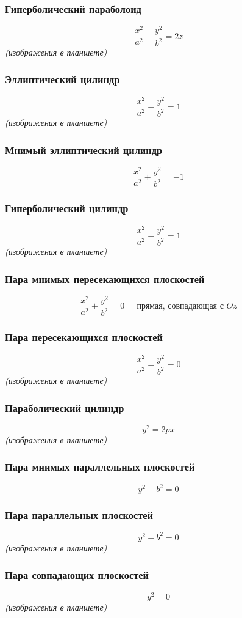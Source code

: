 \documentclass{article}
\begin{document}
\subsubsection{Гиперболический параболоид}
\[
    \frac{x^2}{a^2} - \frac{y^2}{b^2} = 2z
\]
\textit{(изображения в планшете)}

\subsubsection{Эллиптический цилиндр}
\[
    \frac{x^2}{a^2} + \frac{y^2}{b^2} = 1
\]
\textit{(изображения в планшете)}

\subsubsection{Мнимый эллиптический цилиндр}
\[
    \frac{x^2}{a^2} + \frac{y^2}{b^2} = -1
\]

\subsubsection{Гиперболический цилиндр}
\[
    \frac{x^2}{a^2} - \frac{y^2}{b^2} = 1
\]
\textit{(изображения в планшете)}

\subsubsection{Пара мнимых пересекающихся плоскостей}
\[
    \frac{x^2}{a^2} + \frac{y^2}{b^2} = 0 ~~~~~ \text{ прямая, совпадающая с } Oz
\]

\subsubsection{Пара пересекающихся плоскостей}
\[
    \frac{x^2}{a^2} - \frac{y^2}{b^2} = 0
\]
\textit{(изображения в планшете)}

\subsubsection{Параболический цилиндр}
\[
    y^2 = 2px
\]
\textit{(изображения в планшете)}

\subsubsection{Пара мнимых параллельных плоскостей}
\[
    y^2 + b^2 = 0
\]

\subsubsection{Пара параллельных плоскостей}
\[
    y^2 - b^2 = 0
\]
\textit{(изображения в планшете)}

\subsubsection{Пара совпадающих плоскостей}
\[
    y^2 = 0
\]
\textit{(изображения в планшете)}
\end{document}
